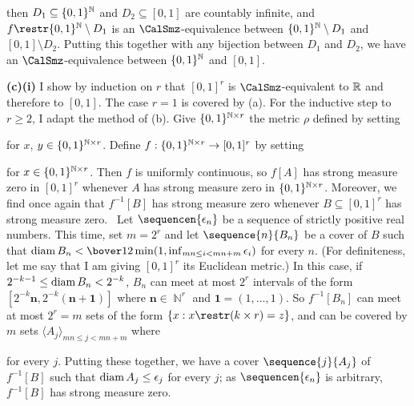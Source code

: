 {\noindent then $D_1\subseteq\{0,1\}^{\Bbb N}$ and $D_2\subseteq[0,1]$
are countably infinite, and $f\restr\{0,1\}^{\Bbb N}\setminus D_1$ is
an $\CalSmz$-equivalence between $\{0,1\}^{\Bbb N}\setminus D_1$ and
$[0,1]\setminus D_2$.   Putting this together with any bijection
between $D_1$ and $D_2$, we have an $\CalSmz$-equivalence between
$\{0,1\}^{\Bbb N}$ and $[0,1]$.

\medskip

{\bf (c)(i)} I show by induction on $r$ that $[0,1]^r$ is
$\CalSmz$-equivalent to $\Bbb R$ and therefore to $[0,1]$.   The case
$r=1$ is covered by (a).   For the inductive step to $r\ge 2$, I adapt
the method of (b).   Give $\{0,1\}^{\Bbb N\times r}$ the metric $\rho$
defined by setting


\noindent for $x$, $y\in\{0,1\}^{\Bbb N\times r}$.   Define
$f:\{0,1\}^{\Bbb N\times r}\to[0,1]^r$ by setting


\noindent for $x\in \{0,1\}^{\Bbb N\times r}$.   Then $f$ is uniformly
continuous, so $f[A]$ has strong measure zero in $[0,1]^r$ whenever
$A$
has strong measure zero in $\{0,1\}^{\Bbb N\times r}$.   Moreover, we
find once again that $f^{-1}[B]$ has strong measure zero whenever
$B\subseteq[0,1]^r$ has strong measure zero.   \Prf\ Let
$\sequencen{\epsilon_n}$ be a sequence of strictly positive real
numbers.   This time, set $m=2^r$ and let $\sequence{n}{B_n}$ be a
cover of $B$ such that
$\diam B_n<\bover12\min(1,\inf_{mn\le i<mn+m}\epsilon_i)$ for every
$n$.   (For definiteness, let me say that I am giving $[0,1]^r$ its
Euclidean
metric.)   In this case, if $2^{-k-1}\le\mathop{\text{diam}} B_n<2^{-k}$, $B_n$ can
meet at most $2^r$ intervals of the form
$[2^{-k}\pmb{n},2^{-k}(\pmb{n}+\pmb{1})]$ where $\pmb{n}\in\BbbN^r$ and
$\pmb{1}=(1,\ldots,1)$.   So $f^{-1}[B_n]$ can meet at most $2^r=m$ sets
of the form $\{x:x\restr(k\times r)=z\}$, and can be covered by $m$
sets $\langle A_j\rangle_{mn\le j<mn+m}$ where


\noindent for every $j$.   Putting these together, we have a cover
$\sequence{j}{A_j}$ of $f^{-1}[B]$ such that $\mathop{\text{diam}} A_j\le\epsilon_j$
for every $j$;  as $\sequencen{\epsilon_n}$ is arbitrary, $f^{-1}[B]$
has strong measure zero.\ \Qed

}
